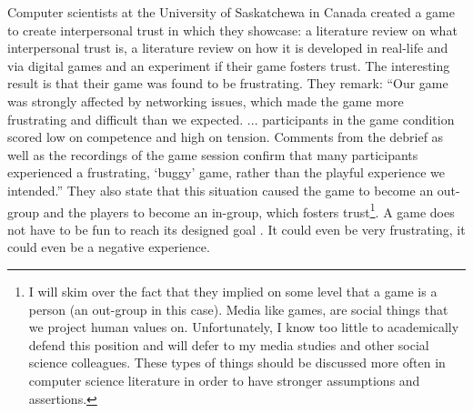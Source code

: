 Computer scientists at the University of Saskatchewa in Canada created a game to create interpersonal trust in which they showcase: a literature review on what interpersonal trust is, a literature review on how it is developed in real-life and via digital games and an experiment if their game fosters trust. The interesting result is that their game was found to be frustrating. They remark:  ``Our game was strongly affected by networking issues, which made the game more frustrating and difficult than we expected. ... participants in the game condition scored low on competence and high on tension. Comments from the debrief as well as the recordings of the game session confirm that many participants experienced a frustrating, `buggy' game, rather than the playful experience we intended.'' \cite{depping2016} They also state that this situation caused the game to become an out-group and the players to become an in-group, which fosters trust\footnote{I will skim over the fact that they implied on some level that a game is a person (an out-group in this case). Media like games, are social things that we project human values on. Unfortunately, I know too little to academically defend this position and will defer to my media studies and other social science colleagues. These types of things should be discussed more often in computer science literature in order to have stronger assumptions and assertions.}. A game does not have to be fun to reach its designed goal \cite{depping2016}. It could even be very frustrating, it could even be a negative experience. 





